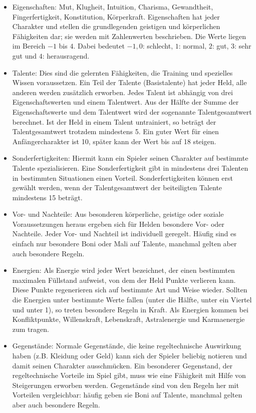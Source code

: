 \begin{itemize}
\item Eigenschaften: Mut, Klugheit, Intuition, Charisma, Gewandtheit, Fingerfertigkeit, Konstitution, Körperkraft. Eigenschaften hat jeder Charakter und stellen die grundlegenden geistigen und körperlichen Fähigkeiten dar; sie werden mit Zahlenwerten beschrieben. Die Werte liegen im Bereich $-1$ bis $4$. Dabei bedeutet $-1, 0$: schlecht, $1$: normal, $2$: gut, $3$: sehr gut und $4$: herausragend. 

\item Talente: Dies sind die gelernten Fähigkeiten, die Training und spezielles Wissen voraussetzen. Ein Teil der Talente (Basistalente) hat jeder Held, alle anderen werden zusätzlich erworben. Jedes Talent ist abhängig von drei Eigenschaftswerten und einem Talentwert. Aus der Hälfte der Summe der Eigenschaftswerte und dem Talentwert wird der sogenannte Talentgesamtwert berechnet. Ist der Held in einem Talent untrainiert, so beträgt der Talentgesamtwert trotzdem mindestens 5. Ein guter Wert für einen Anfängercharakter ist 10, später kann der Wert bis auf 18 steigen.

\item Sonderfertigkeiten: Hiermit kann ein Spieler seinen Charakter auf bestimmte Talente spezialisieren. Eine Sonderfertigkeit gibt in mindestens drei Talenten in bestimmten Situationen einen Vorteil. Sonderfertigkeiten können erst gewählt werden, wenn der Talentgesamtwert der beiteiligten Talente mindestens 15 beträgt.

\item Vor- und Nachteile: Aus besonderen körperliche, geistige oder soziale Voraussetzungen heraus ergeben sich für Helden besondere Vor- oder Nachteile. Jeder Vor- und Nachteil ist individuell geregelt. Häufig sind es einfach nur besondere Boni oder Mali auf Talente, manchmal gelten aber auch besondere Regeln.

\item Energien: Als Energie wird jeder Wert bezeichnet, der einen bestimmten maximalen Füllstand aufweist, von dem der Held Punkte verlieren kann. Diese Punkte regenerieren sich auf bestimmte Art und Weise wieder. Sollten die Energien unter bestimmte Werte fallen (unter die Hälfte, unter ein Viertel und unter 1), so treten besondere Regeln in Kraft. Als Energien kommen bei \StoryDSA Konfliktpunkte, Willenskraft, Lebenskraft, Astralenergie und Karmaenergie zum tragen.

\item Gegenstände: Normale Gegenstände, die keine regeltechnische Auswirkung haben (z.B. Kleidung oder Geld) kann sich der Spieler beliebig notieren und damit seinen Charakter ausschmücken. Ein besonderer Gegenstand, der regeltechnische Vorteile im Spiel gibt, muss wie eine Fähigkeit mit Hilfe von Steigerungen erworben werden. Gegenstände sind von den Regeln her mit Vorteilen vergleichbar: häufig geben sie Boni auf Talente, manchmal gelten aber auch besondere Regeln.


\end{itemize}
